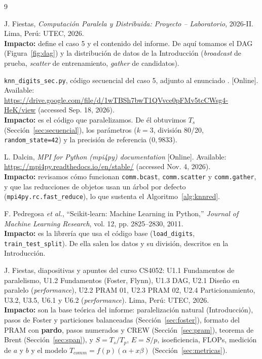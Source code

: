 \documentclass[11pt,a4paper]{article}
\begin{document}
\renewcommand{\refname}{Bibliografía}
\begin{thebibliography}{9}
\setlength{\itemsep}{3pt}

 J. Fiestas, \textit{Computación Paralela y Distribuida: Proyecto -- Laboratorio}, 2026-II. Lima, Perú: UTEC, 2026.\\
\textbf{Impacto:} define el caso 5 y el contenido del informe. De aquí tomamos el DAG (Figura~\ref{fig:dag}) y la distribución de datos de la Introducción (\textit{broadcast} de prueba, \textit{scatter} de entrenamiento, \textit{gather} de candidatos).

 \texttt{knn\_digits\_sec.py}, código secuencial del caso 5, adjunto al enunciado \cite{enunciado}. [Online]. Available: \url{https://drive.google.com/file/d/1wTBSh7bwT1QVvce0pFMv5tcCWsg4-HeK/view} (accessed Sep. 18, 2026).\\
\textbf{Impacto:} es el código que paralelizamos. De él obtuvimos $T_s$ (Sección~\ref{sec:secuencial}), los parámetros ($k=3$, división 80/20, \texttt{random\_state=42}) y la precisión de referencia ($0{,}9833$).

 L. Dalcin, \textit{MPI for Python (mpi4py) documentation} [Online]. Available: \url{https://mpi4py.readthedocs.io/en/stable/} (accessed Nov. 4, 2026).\\
\textbf{Impacto:} revisamos cómo funcionan \texttt{comm.bcast}, \texttt{comm.scatter} y \texttt{comm.gather}, y que las reducciones de objetos usan un árbol por defecto (\texttt{mpi4py.rc.fast\_reduce}), lo que sustenta el Algoritmo~\ref{alg:knnred}.

 F. Pedregosa \textit{et al.}, ``Scikit-learn: Machine Learning in Python,'' \textit{Journal of Machine Learning Research}, vol. 12, pp. 2825--2830, 2011.\\
\textbf{Impacto:} es la librería que usa el código base (\texttt{load\_digits}, \texttt{train\_test\_split}). De ella salen los datos y su división, descritos en la Introducción.

 J. Fiestas, diapositivas y apuntes del curso CS4052: U1.1 Fundamentos de paralelismo, U1.2 Fundamentos (Foster, Flynn), U1.3 DAG, U2.1 Diseño en paralelo (\textit{performance}), U2.2 PRAM 01, U2.3 PRAM 02, U2.4 Particionamiento, U3.2, U3.5, U6.1 y U6.2 (\textit{performance}). Lima, Perú: UTEC, 2026.\\
\textbf{Impacto:} son la base teórica del informe: paralelización natural (Introducción), pasos de Foster y particiones balanceadas (Sección~\ref{sec:foster}), formato del PRAM con \textbf{pardo}, pasos numerados y CREW (Sección~\ref{sec:pram}), teorema de Brent (Sección~\ref{sec:span}), y $S=T_s/T_p$, $E=S/p$, isoeficiencia, FLOPs, medición de $a$ y $b$ y el modelo $T_{comm}=f(p)(\alpha+x\beta)$ (Sección~\ref{sec:metricas}).


\end{thebibliography}
\end{document}
